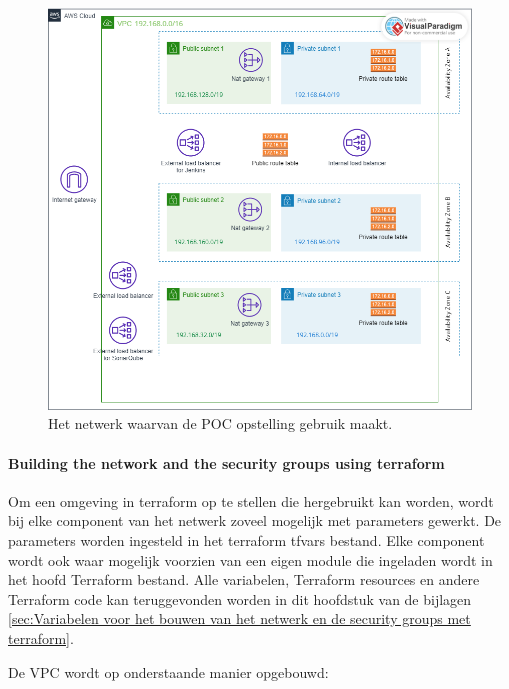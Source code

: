 \begin{figure}[H]
  \includegraphics[scale=0.45]{graphics/network.png}
\caption{\label{fig:aws_networkfigure} Het netwerk waarvan de POC opstelling gebruik maakt.}
\end{figure}

\paragraph{
{Building the network and the security groups using terraform}}
\label{sec:Bouwen van het netwerk en de security groups met terraform}

Om een omgeving in terraform op te stellen die hergebruikt kan worden, wordt bij elke component van het netwerk zoveel mogelijk met parameters gewerkt. De parameters worden ingesteld in het terraform tfvars bestand. Elke component wordt ook waar mogelijk voorzien van een eigen module die ingeladen wordt in het hoofd Terraform bestand. Alle variabelen, Terraform resources en andere Terraform code kan teruggevonden worden in dit hoofdstuk van de bijlagen \ref{sec:Variabelen voor het bouwen van het netwerk en de security groups met terraform}.
\newline

De VPC wordt op onderstaande manier opgebouwd:
\newline

